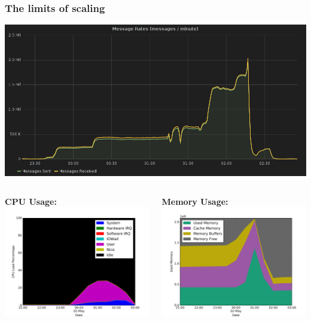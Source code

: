 \documentclass[aspectratio=169,11pt,hyperref={colorlinks=true}]{beamer}
\begin{document}
\begin{frame}
    \frametitle{The limits of scaling}
    \centering
    \includegraphics[width=.9\textwidth]{manual-load-test.png}
\end{frame}

\begin{frame}
    \begin{columns}[T]
        \begin{column}{.48\textwidth}
            \textbf{CPU Usage:}\\
            \includegraphics[width=1.2\textwidth]{manual_load_cpu_usage.png}
        \end{column}
        \begin{column}{.48\textwidth}
            \textbf{Memory Usage:}\\
            \includegraphics[width=1.2\textwidth]{manual_load_ram_usage.png}

\end{column}
\end{columns}
\end{frame}
\end{document}
